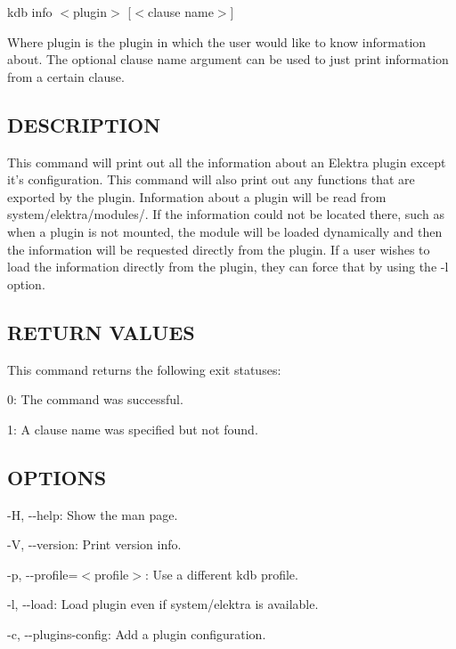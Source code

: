 {\ttfamily kdb info $<$plugin$>$ \mbox{[}$<$clause name$>$\mbox{]}}

Where {\ttfamily plugin} is the plugin in which the user would like to know information about. The optional {\ttfamily clause name} argument can be used to just print information from a certain clause.

\subsection*{D\+E\+S\+C\+R\+I\+P\+T\+I\+O\+N}

This command will print out all the information about an Elektra plugin except it's configuration. This command will also print out any functions that are exported by the plugin. Information about a plugin will be read from {\ttfamily system/elektra/modules/}. If the information could not be located there, such as when a plugin is not mounted, the module will be loaded dynamically and then the information will be requested directly from the plugin. If a user wishes to load the information directly from the plugin, they can force that by using the {\ttfamily -\/l} option.

\subsection*{R\+E\+T\+U\+R\+N V\+A\+L\+U\+E\+S}

This command returns the following exit statuses\+:


\begin{DoxyItemize}
\item 0\+: The command was successful.
\item 1\+: A {\ttfamily clause name} was specified but not found.
\end{DoxyItemize}

\subsection*{O\+P\+T\+I\+O\+N\+S}


\begin{DoxyItemize}
\item {\ttfamily -\/\+H}, {\ttfamily -\/-\/help}\+: Show the man page.
\item {\ttfamily -\/\+V}, {\ttfamily -\/-\/version}\+: Print version info.
\item {\ttfamily -\/p}, {\ttfamily -\/-\/profile}=$<$profile$>$\+: Use a different kdb profile.
\item {\ttfamily -\/l}, {\ttfamily -\/-\/load}\+: Load plugin even if system/elektra is available.
\item {\ttfamily -\/c}, {\ttfamily -\/-\/plugins-\/config}\+: Add a plugin configuration.
\end{DoxyItemize}

